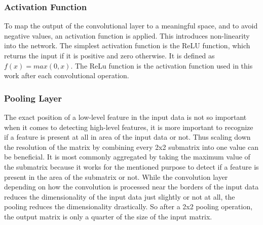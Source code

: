 \subsubsection*{Activation Function}

To map the output of the convolutional layer to a meaningful space, and to avoid negative values, an activation function is applied. This introduces non-linearity into the network. The simplest activation function is the ReLU function, which returns the input if it is positive and zero otherwise. It is defined as $f(x) = max(0, x)$. The ReLu function is the activation function used in this work after each convolutional operation.

\subsubsection*{Pooling Layer}

The exact position of a low-level feature in the input data is not so important when it comes to detecting high-level features,
it is more important to recognize if a feature is present at all in area of the input data or not.
Thus scaling down the resolution of the matrix by combining every 2x2 submatrix into one value can be beneficial.
It is most commonly aggregated by taking the maximum value of the submatrix because it works for the mentioned purpose to detect if a feature is present in the area of the submatrix or not. While the convolution layer depending on how the convolution is processed near the borders of the input data reduces the dimensionality of the input data just slightly or not at all, the pooling reduces the dimensionality drastically. So after a 2x2 pooling operation, the output matrix is only a quarter of the size of the input matrix.


